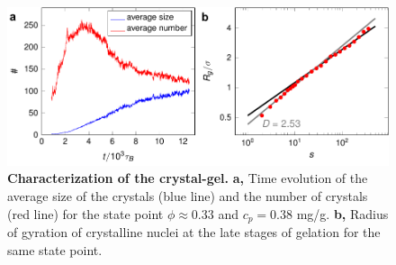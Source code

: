 \documentclass[preprint,amsmath,amssymb,superscriptaddress]{revtex4-1}
\begin{document}
\begin{figure}[!t]
 \centering
 \includegraphics{characterisation}
\caption{{\bf Characterization of the crystal-gel.} {\bf a,} Time evolution of the average size of the crystals (blue line) and the number of crystals (red line) for the state point $\phi\approx 0.33$ and $c_p=0.38$ mg/g. {\bf b,} Radius of gyration of crystalline nuclei at the late stages of gelation for the same state point.} 
 \label{fig:crystals}
\end{figure}

\clearpage 
\end{document}
